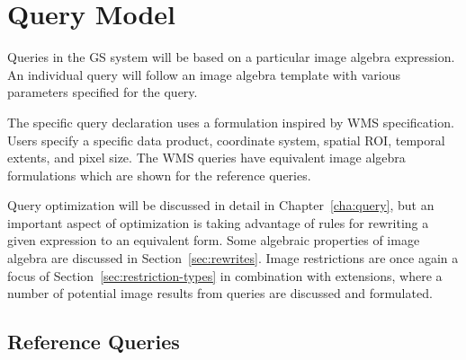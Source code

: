 \documentclass{ucdthesis}       %
\begin{document}
\section{Query Model}
\label{sec:qm}

Queries in the \ac{GS} system will be based on a particular image
algebra expression.  An individual query will follow an image algebra
template with various parameters specified for the query.

The specific query declaration uses a formulation inspired by \ac{WMS}
specification.  Users specify a specific data product, coordinate
system, spatial \ac{ROI}, temporal extents, and pixel size.  The
\ac{WMS} queries have equivalent image algebra formulations which
are shown for the reference queries.

Query optimization will be discussed in detail in
Chapter~\ref{cha:query}, but an important aspect of optimization is
taking advantage of rules for rewriting a given expression to an
equivalent form.  Some algebraic properties of image algebra are
discussed in Section~\ref{sec:rewrites}.  Image restrictions are once
again a focus of Section~\ref{sec:restriction-types} in combination
with extensions, where a number of potential image results from
queries are discussed and formulated.

\subsection{Reference Queries}
\label{sec:queries2}
\end{document}

